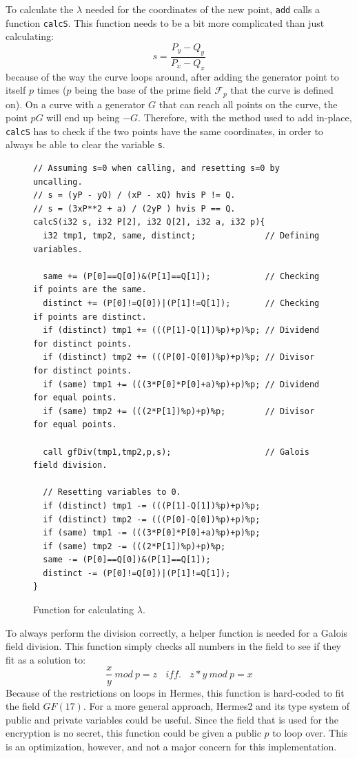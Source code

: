 To calculate the $\lambda$ needed for the coordinates of the new point, \texttt{add} calls a function \texttt{calcS}. This function needs to be a bit more complicated than just calculating:
\[s=\frac{P_y-Q_y}{P_x-Q_x}\]
because of the way the curve loops around, after adding the generator point to itself $p$ times ($p$ being the base of the prime field $\mathcal{F}_p$ that the curve is defined on). On a curve with a generator $G$ that can reach all points on the curve, the point $pG$ will end up being $-G$. Therefore, with the method used to add in-place, \texttt{calcS} has to check if the two points have the same coordinates, in order to always be able to clear the variable \texttt{s}.
\begin{figure}[H]
\begin{Verbatim}
// Assuming s=0 when calling, and resetting s=0 by uncalling. 
// s = (yP - yQ) / (xP - xQ) hvis P != Q.
// s = (3xP**2 + a) / (2yP ) hvis P == Q.
calcS(i32 s, i32 P[2], i32 Q[2], i32 a, i32 p){
  i32 tmp1, tmp2, same, distinct;              // Defining variables.
  
  same += (P[0]==Q[0])&(P[1]==Q[1]);           // Checking if points are the same.
  distinct += (P[0]!=Q[0])|(P[1]!=Q[1]);       // Checking if points are distinct.
  if (distinct) tmp1 += (((P[1]-Q[1])%p)+p)%p; // Dividend for distinct points. 
  if (distinct) tmp2 += (((P[0]-Q[0])%p)+p)%p; // Divisor for distinct points. 
  if (same) tmp1 += (((3*P[0]*P[0]+a)%p)+p)%p; // Dividend for equal points. 
  if (same) tmp2 += (((2*P[1])%p)+p)%p;        // Divisor for equal points. 
  
  call gfDiv(tmp1,tmp2,p,s);                   // Galois field division. 
  
  // Resetting variables to 0. 
  if (distinct) tmp1 -= (((P[1]-Q[1])%p)+p)%p; 
  if (distinct) tmp2 -= (((P[0]-Q[0])%p)+p)%p; 
  if (same) tmp1 -= (((3*P[0]*P[0]+a)%p)+p)%p;
  if (same) tmp2 -= (((2*P[1])%p)+p)%p; 
  same -= (P[0]==Q[0])&(P[1]==Q[1]);
  distinct -= (P[0]!=Q[0])|(P[1]!=Q[1]);
}
\end{Verbatim}
\caption{Function for calculating $\lambda$.}
\end{figure}

To always perform the division correctly, a helper function is needed for a Galois field division. This function simply checks all numbers in the field to see if they fit as a solution to:
\[\frac{x}{y}~mod~p=z~~~~iff.~~~~z*y~mod~p=x\]
Because of the restrictions on loops in Hermes, this function is hard-coded to fit the field $GF(17)$. For a more general approach, Hermes2 and its type system of public and private variables could be useful. Since the field that is used for the encryption is no secret, this function could be given a public $p$ to loop over. This is an optimization, however, and not a major concern for this implementation.
